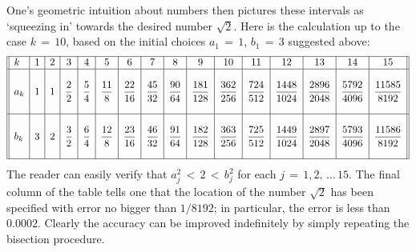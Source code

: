 \V

\noindent One's geometric intuition about numbers then pictures these intervals as `squeezing in' towards the desired number $\sqrt{2}$.
    Here is the calculation up to the case $k \,=\, 10$, based on the initial choices $a_{1} \,=\, 1$, $b_{1} \,=\, 3$ suggested above:
        \begin{displaymath}
        \begin{array}{||l|r|c|c|c|c|c|c|c|c|c|c|c|c|c|c||} \hline
        k &   1 & 2 & 3 & 4 & 5 & 6 & 7 & 8 & 9 & 10 & 11 & 12 & 13 & 14 & 15 \\ \hline
          &     &   &   &   &   &   &   &   &   &  &  &  &  &  &    \\
         a_{k} & 1 & 1 & {\displaystyle \frac{2}{2}} & {\displaystyle \frac{5}{4}} & {\displaystyle \frac{11}{8}} &
        {\displaystyle \frac{22}{16}} & {\displaystyle \frac{45}{32}} & {\displaystyle \frac{90}{64}} &{\displaystyle  \frac{181}{128}} &
        {\displaystyle \frac{362}{256}} & {\displaystyle \frac{724}{512}} & {\displaystyle \frac{1448}{1024}} & {\displaystyle \frac{2896}{2048}}  & {\displaystyle \frac{5792}{4096}} & {\displaystyle \frac{11585}{8192}} \\ 
          &     &   &   &   &   &   &   &   &   & &  &  &  &  &  \\  \hline
           &     &   &   &   &   &   &   &   &   &  &  &  &  &  &  \\
        b_{k} & 3 & 2 &{\displaystyle  \frac{3}{2}} & {\displaystyle \frac{6}{4}} & {\displaystyle \frac{12}{8}} &
        {\displaystyle \frac{23}{16}} & {\displaystyle \frac{46}{32}} & {\displaystyle \frac{91}{64}} &{\displaystyle  \frac{182}{128}} &
        {\displaystyle \frac{363}{256}} & {\displaystyle \frac{725}{512}}  & {\displaystyle \frac{1449}{1024}} & {\displaystyle \frac{2897}{2048}} & {\displaystyle \frac{5793}{4096}} & {\displaystyle \frac{11586}{8192}}  \\ 
  &     &   &   &   &   &   &   &   &   & &  &  &  &  &   \\ \hline
        \end{array}
        \end{displaymath}
    The reader can easily verify that $a_{j}^{2}\,<\,2\,<\,b_{j}^{2}$ for each $j \,=\, 1,2,\,{\ldots}\,15$.
    The final column of the table tells one that the location of the number $\sqrt{2}$ has been specified with error no bigger than $1/8192$; in particular, the error is less than~$0.0002$.
    Clearly the accuracy can be improved indefinitely by simply repeating the bisection procedure.

